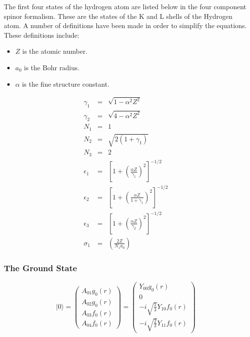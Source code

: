 \documentclass[a4paper,titlepage]{report}
\newcommand{\ket}[1]{|#1 \rangle}
\begin{document}
	The first four states of the hydrogen atom are listed below in the four
	component spinor formalism. These are the states of the K and L shells of
	the Hydrogen atom. A number of definitions have been made in order
	to simplify the equations. These definitions include:
	\begin{itemize}
		\item $Z$ is the atomic number.
		\item $a_0$ is the Bohr radius.
		\item $\alpha$ is the fine structure constant.
	\end{itemize}
	\begin{eqnarray}
		\gamma_1	& = &	\sqrt{1 - \alpha^2 Z^2}		\\
		\gamma_2	& = &  	\sqrt{4 - \alpha^2 Z^2}		\\
		N_1			& = &	1							\\
		N_2			& = &	\sqrt{2(1+\gamma_1)}		\\
		N_3			& = &	2							\\
		\epsilon_1	& = &	\left[ 
							1 + \left( 
								\frac{\alpha Z}{\gamma_1}
							\right)^2
							\right]^{-1/2}				\\
		\epsilon_2	& = &	\left[
							1 + \left( 
								\frac{\alpha Z}{1 + \gamma_1}
							\right)^2
							\right]^{-1/2}				\\
		\epsilon_3	& = &	\left[
							1 + \left(
								\frac{\alpha Z}{\gamma_2}
								\right)^2
							\right]^{-1/2}				\\	
		\sigma_1	& = &	\left(
								\frac{2Z}{N_1 a_0}	
							\right)
	\end{eqnarray}

		\subsubsection{The Ground State}
\begin{equation} \label{eq:dirac-ground}
	\ket{0} = 
		\left(
			\begin{array}{c}
				A_{01} g_0(r) \\
				A_{02} g_0(r) \\
				A_{03} f_0(r) \\
				A_{04} f_0(r)
			\end{array}
		\right)
		=
		\left(
			\begin{array}{c}
				Y_{00} 	g_0(r)	\\
				0	 			\\
				-i \sqrt{\frac{1}{3}} Y_{10} f_0(r) \\
				-i \sqrt{\frac{2}{3}} Y_{11} f_0(r)
			\end{array}
		\right)
\end{equation}
\end{document}
